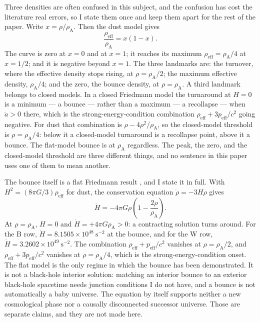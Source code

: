 \documentclass[11pt]{article}
\newcommand{\rhoA}{\rho_{\mathrm{A}}}
\begin{document}
Three densities are often confused in this subject, and the confusion
has cost the literature real errors, so I state them once and keep them
apart for the rest of the paper. Write $x = \rho/\rhoA$. Then the dust
model gives
\begin{equation}
\frac{\rho_{\mathrm{eff}}}{\rhoA} = x(1-x).
\end{equation}
The curve is zero at $x = 0$ and at $x = 1$; it reaches its maximum
$\rho_{\mathrm{eff}} = \rhoA/4$ at $x = 1/2$; and it is negative beyond
$x = 1$. The three landmarks are: the turnover, where the effective
density stops rising, at $\rho = \rhoA/2$; the maximum effective density,
$\rhoA/4$; and the zero, the bounce density, at $\rho = \rhoA$. A third
landmark belongs to closed models. In a closed Friedmann model the
turnaround at $H = 0$ is a minimum --- a bounce --- rather than a maximum
--- a recollapse --- when $\ddot a > 0$ there, which is the
strong-energy-condition combination $\rho_{\mathrm{eff}} +
3p_{\mathrm{eff}}/c^2$ going negative. For dust that combination is
$\rho - 4\rho^2/\rhoA$, so the closed-model threshold is
$\rho = \rhoA/4$: below it a closed-model turnaround is a recollapse
point, above it a bounce. The flat-model bounce is at $\rhoA$
regardless. The peak, the zero, and the closed-model threshold are three
different things, and no sentence in this paper uses one of them to mean
another.

The bounce itself is a flat Friedmann result \cite{Poplawski10}, and I
state it in full. With $H^2 = (8\pi G/3)\rho_{\mathrm{eff}}$ for dust,
the conservation equation $\dot\rho = -3H\rho$ gives
\begin{equation}
\dot H = -4\pi G\rho\left(1 - \frac{2\rho}{\rhoA}\right).
\end{equation}
At $\rho = \rhoA$, $H = 0$ and $\dot H = +4\pi G\rhoA > 0$: a
contracting solution turns around. For the B row,
$\dot H = 8.1505\times10^{48}\ \mathrm{s^{-2}}$ at the bounce, and for
the W row, $\dot H = 3.2602\times10^{49}\ \mathrm{s^{-2}}$. The
combination $\rho_{\mathrm{eff}} + p_{\mathrm{eff}}/c^2$ vanishes at
$\rho = \rhoA/2$, and $\rho_{\mathrm{eff}} + 3p_{\mathrm{eff}}/c^2$
vanishes at $\rho = \rhoA/4$, which is the strong-energy-condition
onset. The flat model is the only regime in which the bounce has been
demonstrated. It is not a black-hole interior solution: matching an
interior bounce to an exterior black-hole spacetime needs junction
conditions I do not have, and a bounce is not automatically a baby
universe. The equation by itself supports neither a new cosmological
phase nor a causally disconnected successor universe. Those are separate
claims, and they are not made here.
\end{document}
